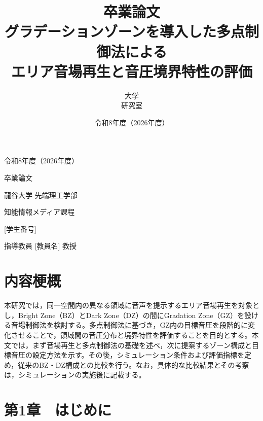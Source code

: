 \documentclass[11pt, a4paper]{article}
\title{\textbf{\Large 卒業論文}\\ \vspace{0.5cm} \Huge グラデーションゾーンを導入した多点制御法による\\エリア音場再生と音圧境界特性の評価}
\author{\Large 大学 \\ \vspace{0.3cm} 研究室 \quad [氏名]}
\date{\Large 令和8年度（2026年度）}
\begin{document}
\thispagestyle{empty}
\begin{center}
\vspace*{1.2cm}
{\Large 令和8年度（2026年度）}\par
\vspace{1.5cm}
{\Large 卒業論文}\par
\vspace{1.4cm}
\setlength{\fboxrule}{1.2pt}
\setlength{\fboxsep}{20pt}
\par
\vfill
{\large 龍谷大学 先端理工学部\par 知能情報メディア課程}\par
\vspace{1.1cm}
{\large [学生番号] \quad [氏名]}\par
\vspace{0.8cm}
{\large 指導教員 [教員名] 教授}
\end{center}
\newpage

\section*{内容梗概}
本研究では，同一空間内の異なる領域に音声を提示するエリア音場再生を対象とし，Bright Zone（BZ）とDark Zone（DZ）の間にGradation Zone（GZ）を設ける音場制御法を検討する。多点制御法に基づき，GZ内の目標音圧を段階的に変化させることで，領域間の音圧分布と境界特性を評価することを目的とする。本文では，まず音場再生と多点制御法の基礎を述べ，次に提案するゾーン構成と目標音圧の設定方法を示す。その後，シミュレーション条件および評価指標を定め，従来のBZ・DZ構成との比較を行う。なお，具体的な比較結果とその考察は，シミュレーションの実施後に記載する。
\newpage

\tableofcontents
\newpage


\section{第1章　はじめに}
\end{document}
